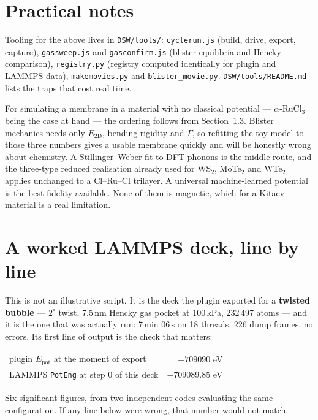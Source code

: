 \documentclass[11pt,a4paper]{article}
\newcommand{\ED}{E_{2\mathrm{D}}}
\begin{document}
\section{Practical notes}

Tooling for the above lives in \texttt{DSW/tools/}: \texttt{cyclerun.js} (build,
drive, export, capture), \texttt{gassweep.js} and \texttt{gasconfirm.js} (blister
equilibria and Hencky comparison), \texttt{registry.py} (registry computed
identically for plugin and LAMMPS data), \texttt{makemovies.py} and
\texttt{blister\_movie.py}. \texttt{DSW/tools/README.md} lists the traps that
cost real time.

For simulating a membrane in a material with no classical potential ---
$\alpha$-RuCl$_3$ being the case at hand --- the ordering follows from
Section~1.3. Blister mechanics needs only $\ED$, bending rigidity and $\Gamma$,
so refitting the toy model to those three numbers gives a usable membrane
quickly and will be honestly wrong about chemistry. A Stillinger--Weber fit to
DFT phonons is the middle route, and the three-type reduced realisation already
used for WS$_2$, MoTe$_2$ and WTe$_2$ applies unchanged to a Cl--Ru--Cl
trilayer. A universal machine-learned potential is the best fidelity available.
None of them is magnetic, which for a Kitaev material is a real limitation.

\appendix

\section{A worked LAMMPS deck, line by line}
\label{sec:deck}

This is not an illustrative script. It is the deck the plugin exported for a
\textbf{twisted bubble} --- $2^\circ$ twist, 7.5\,nm Hencky gas pocket at
100\,kPa, 232\,497 atoms --- and it is the one that was actually run:
7\,min 06\,s on 18 threads, 226 dump frames, no errors. Its first line of output
is the check that matters:

\begin{center}\small
\begin{tabular}{lr}
\toprule
plugin $E_\mathrm{pot}$ at the moment of export & $-709090$ eV \\
LAMMPS \texttt{PotEng} at step 0 of this deck   & $-709089.85$ eV \\
\bottomrule
\end{tabular}
\end{center}

\noindent Six significant figures, from two independent codes evaluating the
same configuration. If any line below were wrong, that number would not match.
\end{document}
